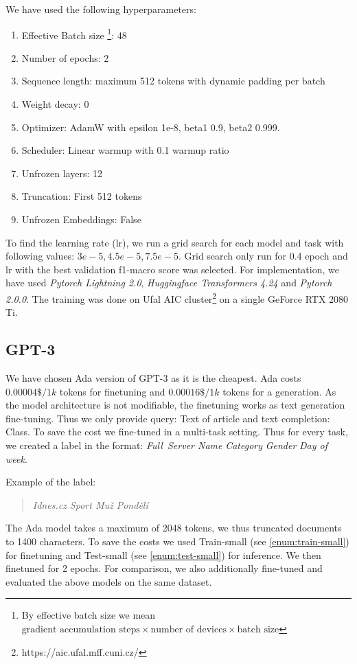 We have used the following hyperparameters:
\begin{enumerate}
    \item Effective Batch size
    \footnote{By effective batch size we mean 
    $\text{gradient accumulation steps} \times \text{number of devices}
    \times \text{batch size}$
    }: 48
    \item Number of epochs: 2
    \item Sequence length: maximum 512 tokens with dynamic padding per batch
    \item Weight decay: 0
    \item Optimizer: AdamW with epsilon 1e-8, beta1 0.9, beta2 0.999.
    \item Scheduler: Linear warmup with 0.1 warmup ratio
    \item Unfrozen layers: 12
    \item Truncation: First 512 tokens
    \item Unfrozen Embeddings: False
\end{enumerate}
To find the learning rate (lr), we run a grid search for each model and task with following values: $3e-5, 4.5e-5, 7.5e-5$.
Grid search only run for 0.4 epoch and lr with the best validation f1-macro score was selected.
For implementation, we have used \textit{Pytorch Lightning 2.0}, \textit{Huggingface Transformers 4.24} and \textit{Pytorch 2.0.0}.
The training was done on Ufal AIC cluster\footnote{https://aic.ufal.mff.cuni.cz/} on a single GeForce RTX 2080 Ti.

\subsection{GPT-3}
\label{sec:gpt-3}
We have chosen Ada version of GPT-3 as it is the cheapest.
Ada costs $0.00004\$/1k$ tokens for finetuning and $0.00016\$/1k$ tokens for a generation.
As the model architecture is not modifiable, the finetuning works
as text generation fine-tuning.
Thus we only provide query: Text of article and text completion: Class.
To save the cost we fine-tuned in a multi-task setting.
Thus for every task, we created a label in the format: \textit{Full\ Server Name} \textit{Category} \textit{Gender} \textit{Day of week}.

Example of the label:
\begin{quotation}
    \textit{Idnes.cz Sport Muž Pondělí}
\end{quotation}

The Ada model takes a maximum of 2048 tokens, we thus truncated documents to 1400 characters.
To save the costs we used Train-small (see \autoref{enum:train-small}) for finetuning and
Test-small (see \autoref{enum:test-small}) for inference.
We then finetuned for 2 epochs.
For comparison, we also additionally fine-tuned and evaluated the above models on the same dataset.

